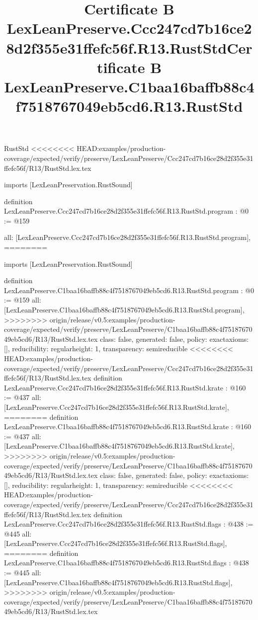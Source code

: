 \begin{lexlean}{RustStd}
<<<<<<<< HEAD:examples/production-coverage/expected/verify/preserve/LexLeanPreserve/Ccc247cd7b16ce28d2f355e31ffefc56f/R13/RustStd.lex.tex
\title{Certificate B LexLeanPreserve.Ccc247cd7b16ce28d2f355e31ffefc56f.R13.RustStd}
\begin{coremodule}
imports [LexLeanPreservation.RustSound]

definition LexLeanPreserve.Ccc247cd7b16ce28d2f355e31ffefc56f.R13.RustStd.program : @0 := @159 {
  all: [LexLeanPreserve.Ccc247cd7b16ce28d2f355e31ffefc56f.R13.RustStd.program],
========
\title{Certificate B LexLeanPreserve.C1baa16baffb88c4f7518767049eb5cd6.R13.RustStd}
\begin{coremodule}
imports [LexLeanPreservation.RustSound]

definition LexLeanPreserve.C1baa16baffb88c4f7518767049eb5cd6.R13.RustStd.program : @0 := @159 {
  all: [LexLeanPreserve.C1baa16baffb88c4f7518767049eb5cd6.R13.RustStd.program],
>>>>>>>> origin/release/v0.5:examples/production-coverage/expected/verify/preserve/LexLeanPreserve/C1baa16baffb88c4f7518767049eb5cd6/R13/RustStd.lex.tex
  class: false,
  generated: false,
  policy: exact{axioms: []},
  reducibility: regular{height: 1},
  transparency: semireducible
}
<<<<<<<< HEAD:examples/production-coverage/expected/verify/preserve/LexLeanPreserve/Ccc247cd7b16ce28d2f355e31ffefc56f/R13/RustStd.lex.tex
definition LexLeanPreserve.Ccc247cd7b16ce28d2f355e31ffefc56f.R13.RustStd.krate : @160 := @437 {
  all: [LexLeanPreserve.Ccc247cd7b16ce28d2f355e31ffefc56f.R13.RustStd.krate],
========
definition LexLeanPreserve.C1baa16baffb88c4f7518767049eb5cd6.R13.RustStd.krate : @160 := @437 {
  all: [LexLeanPreserve.C1baa16baffb88c4f7518767049eb5cd6.R13.RustStd.krate],
>>>>>>>> origin/release/v0.5:examples/production-coverage/expected/verify/preserve/LexLeanPreserve/C1baa16baffb88c4f7518767049eb5cd6/R13/RustStd.lex.tex
  class: false,
  generated: false,
  policy: exact{axioms: []},
  reducibility: regular{height: 1},
  transparency: semireducible
}
<<<<<<<< HEAD:examples/production-coverage/expected/verify/preserve/LexLeanPreserve/Ccc247cd7b16ce28d2f355e31ffefc56f/R13/RustStd.lex.tex
definition LexLeanPreserve.Ccc247cd7b16ce28d2f355e31ffefc56f.R13.RustStd.flags : @438 := @445 {
  all: [LexLeanPreserve.Ccc247cd7b16ce28d2f355e31ffefc56f.R13.RustStd.flags],
========
definition LexLeanPreserve.C1baa16baffb88c4f7518767049eb5cd6.R13.RustStd.flags : @438 := @445 {
  all: [LexLeanPreserve.C1baa16baffb88c4f7518767049eb5cd6.R13.RustStd.flags],
>>>>>>>> origin/release/v0.5:examples/production-coverage/expected/verify/preserve/LexLeanPreserve/C1baa16baffb88c4f7518767049eb5cd6/R13/RustStd.lex.tex
}}}
\end{coremodule}}
\end{coremodule}
\end{lexlean}
